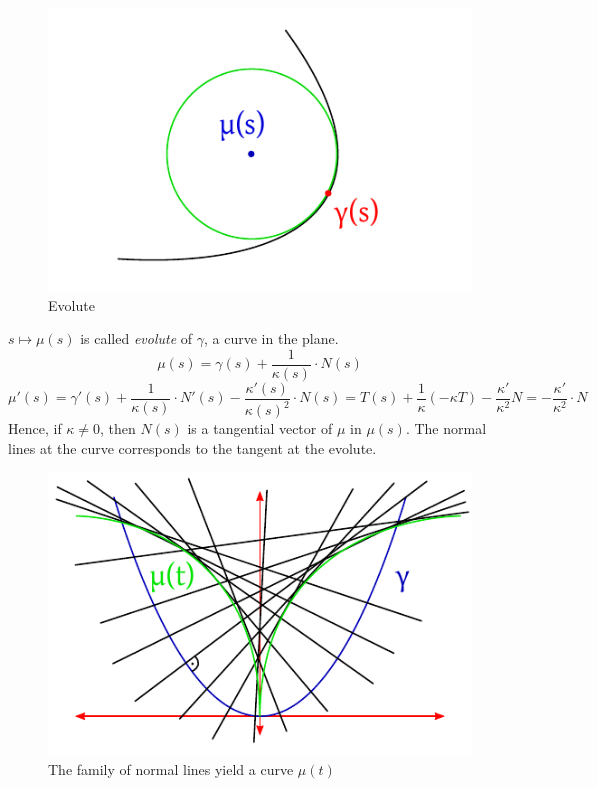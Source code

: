\documentclass{article}
\begin{document}
\begin{figure}[p]
  \begin{center}
    \includegraphics{img/57_evolute.pdf}
    \caption{Evolute}
    \label{img:evolute}
  \end{center}
\end{figure}

$s \mapsto \mu(s)$ is called \emph{evolute} of $\gamma$, a curve in the plane.
\[ \mu(s) = \gamma(s) + \frac{1}{\kappa(s)} \cdot N(s) \]
\[ \mu'(s) = \gamma'(s) + \frac{1}{\kappa(s)} \cdot N'(s) - \frac{\kappa'(s)}{\kappa(s)^2} \cdot N(s) = T(s) + \frac{1}{\kappa} \left(-\kappa T\right) - \frac{\kappa'}{\kappa^2} N = -\frac{\kappa'}{\kappa^2} \cdot N \]
Hence, if $\kappa \neq 0$, then $N(s)$ is a tangential vector of $\mu$ in $\mu(s)$.
The normal lines at the curve corresponds to the tangent at the evolute.

\begin{figure}[t]
  \begin{center}
    \includegraphics{img/58_family_of_normal_lines.pdf}
    \caption{The family of normal lines yield a curve $\mu(t)$}
    \label{img:normallines}
  \end{center}
\end{figure}
\end{document}

